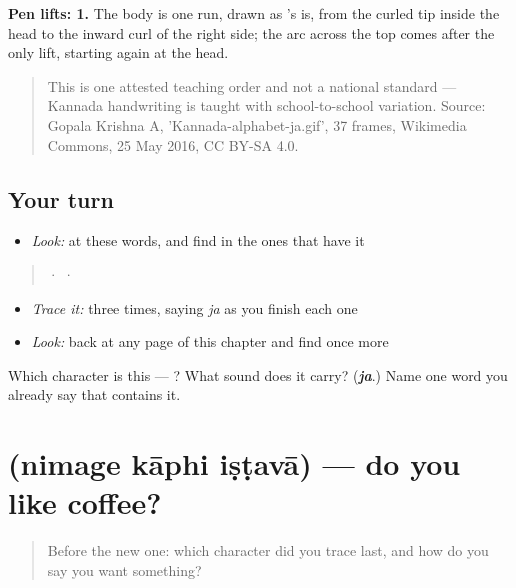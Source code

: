 \textbf{Pen lifts: 1.} The body is one run, drawn as 's is, from the curled tip inside the head to the inward curl of the right side; the arc across the top comes after the only lift, starting again at the head.

\begin{quote}
This is one attested teaching order and not a national standard — Kannada handwriting is taught with school-to-school variation. Source: Gopala Krishna A, 'Kannada-alphabet-ja.gif', 37 frames, Wikimedia Commons, 25 May 2016, CC BY-SA 4.0.
\end{quote}

\subsection*{Your turn}
\begin{itemize}
\raggedright
  \item \emph{Look:} at these words, and find  in the ones that have it
\end{itemize}

\begin{quote}
  ·    ·  
\end{quote}

\begin{itemize}
\raggedright
  \item \emph{Trace it:}  three times, saying \emph{ja} as you finish each one
  \item \emph{Look:} back at any page of this chapter and find  once more
\end{itemize}

\begin{tcolorbox}[breakable,colback=teal!4,colframe=teal!35!black,title={Before you move on}]
Which character is this — ? What sound does it carry? (\emph{\textbf{ja}}.) Name one word you already say that contains it.
\end{tcolorbox}
\section[\texorpdfstring{\kn{ನಿಮಗೆ} \kn{ಕಾಫಿ} \kn{ಇಷ್ಟವಾ} (nimage kāphi iṣṭavā)}{ನಿಮಗೆ ಕಾಫಿ ಇಷ್ಟವಾ (nimage kāphi iṣṭavā)}]{   (nimage kāphi iṣṭavā) — do you like coffee?}

\label{lesson:KA-C72-do-you-like}



\begin{quote}
Before the new one: which character did you trace last, and how do you say you want something?
\end{quote}


